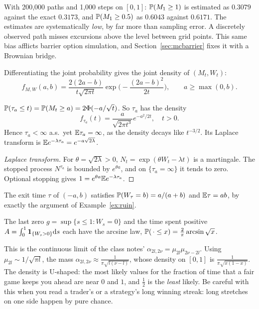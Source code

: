 \begin{numcheck}
With 200{,}000 paths and 1{,}000 steps on $[0,1]$: $\mathbb{P}(M_1\ge1)$ is estimated as $0.3079$ against the exact $0.3173$, and $\mathbb{P}(M_1\ge0.5)$ as $0.6043$ against $0.6171$. The estimates are systematically \emph{low}, by far more than sampling error. A discretely observed path misses excursions above the level between grid points. This same bias afflicts barrier option simulation, and Section~\ref{sec:mcbarrier} fixes it with a Brownian bridge.
\end{numcheck}

Differentiating the joint probability gives the joint density of $(M_t,W_t)$:
\begin{equation}\label{eq:jointmax}
f_{M,W}(a,b)=\frac{2(2a-b)}{t\sqrt{2\pi t}}\exp\!\Big(-\frac{(2a-b)^2}{2t}\Big),\qquad a\ge\max(0,b).
\end{equation}

\begin{corollary}\label{cor:fpt}
$\mathbb{P}(\tau_a\le t)=\mathbb{P}(M_t\ge a)=2\Phi(-a/\sqrt t)$. So $\tau_a$ has the density
\[
f_{\tau_a}(t)=\frac{a}{\sqrt{2\pi t^3}}e^{-a^2/2t},\quad t>0.
\]
Hence $\tau_a<\infty$ a.s.\ yet $\mathbb{E}\tau_a=\infty$, as the density decays like $t^{-3/2}$. Its Laplace transform is $\mathbb{E} e^{-\lambda\tau_a}=e^{-a\sqrt{2\lambda}}$.
\end{corollary}
\begin{proof}[Laplace transform]
For $\theta=\sqrt{2\lambda}>0$, $N_t=\exp(\theta W_t-\lambda t)$ is a martingale. The stopped process $N^{\tau_a}$ is bounded by $e^{\theta a}$, and on $\{\tau_a=\infty\}$ it tends to zero. Optional stopping gives $1=e^{\theta a}\mathbb{E} e^{-\lambda\tau_a}$.
\end{proof}

\begin{example}
The exit time $\tau$ of $(-a,b)$ satisfies $\mathbb{P}(W_\tau=b)=a/(a+b)$ and $\mathbb{E}\tau=ab$, by exactly the argument of Example~\ref{ex:ruin}.
\end{example}

\begin{theorem}\label{thm:arcsine}
The last zero $g=\sup\{s\le1:W_s=0\}$ and the time spent positive $A=\int_0^1\mathbf{1}_{\{W_s>0\}}\mathrm{d} s$ each have the arcsine law, $\mathbb{P}(\,\cdot\le x)=\frac2\pi\arcsin\sqrt x$.
\end{theorem}

This is the continuous limit of the class notes' $\alpha_{2l,2\nu}=\mu_{2l}\mu_{2\nu-2l}$. Using $\mu_{2l}\sim1/\sqrt{\pi l}$, the mass $\alpha_{2l,2\nu}\approx\frac{1}{\pi\sqrt{l(\nu-l)}}$, whose density on $[0,1]$ is $\frac{1}{\pi\sqrt{x(1-x)}}$. The density is U-shaped: the most likely values for the fraction of time that a fair game keeps you ahead are near $0$ and $1$, and $\tfrac12$ is the \emph{least} likely. Be careful with this when you read a trader's or a strategy's long winning streak: long stretches on one side happen by pure chance.

